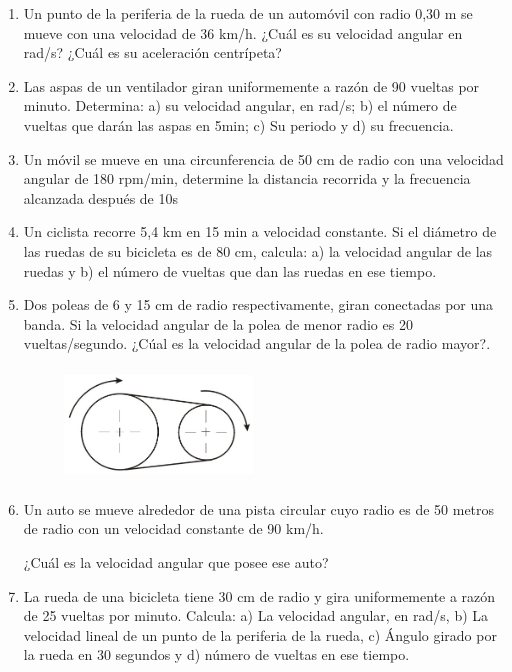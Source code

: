 \documentclass[a5paper,pagesize,10pt,bibtotoc,pointlessnumbers,
normalheadings,DIV=9,fleqn,x11names,table,twoside=false]{scrbook}
\begin{document}
\begin{enumerate}
\item Un punto de la periferia de la rueda de un automóvil con
 radio 0,30 m se mueve con una velocidad de 36 km/h. ¿Cuál es su 
velocidad angular en rad/s?
¿Cuál es su aceleración centrípeta? 

\item Las aspas de un ventilador giran uniformemente a razón de 90 vueltas por minuto. Determina:
 a) su velocidad angular, en 
rad/s; b) el número de vueltas que darán las aspas en 5min; c) Su periodo y d)
 su frecuencia.

\item Un móvil se mueve en una 
 circunferencia de 50 cm de radio con una velocidad angular de 180 rpm/min, determine la 
distancia 
recorrida y la frecuencia alcanzada después de 10s

 \item Un ciclista recorre 5,4 km en 15 min a velocidad constante. Si el diámetro de las ruedas de su bicicleta es de 80 cm, 
calcula: a) la velocidad angular de las ruedas y b) el número de vueltas que dan las ruedas en ese tiempo.

\item Dos poleas de 6 y 15 cm de radio respectivamente, giran conectadas por una banda. Si la velocidad angular de la polea de 
menor radio es 20 vueltas/segundo. ¿Cúal es la velocidad angular de la polea de radio mayor?.
\begin{figure}[H]
 \centering
\includegraphics[width=5.0cm,height=3.0cm]{images/poleas.jpg}
\end{figure}

\item Un auto se mueve alrededor de
 una pista circular cuyo radio es de 50 metros de radio con un velocidad constante de 90 km/h.

 ¿Cuál es la velocidad angular que posee ese auto?
 
\item La rueda de una bicicleta tiene 30 cm de radio y gira uniformemente a razón de 25 vueltas
 por minuto. Calcula: a) La 
velocidad angular, en rad/s, b) La velocidad lineal de un punto de la periferia
 de la rueda, c) Ángulo girado por la rueda en 30 
segundos y d) número de vueltas en ese tiempo.



\end{enumerate}
\end{document}
